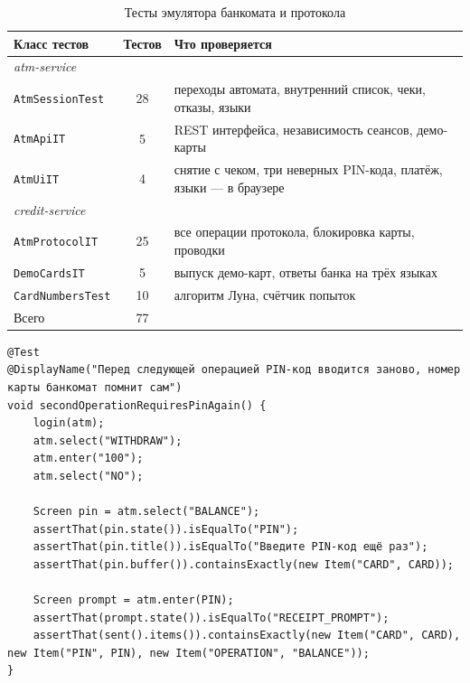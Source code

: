 \documentclass[14pt,a4paper]{extarticle}
\begin{document}
\begin{table}[H]
\caption{Тесты эмулятора банкомата и протокола}
\label{tab:tests}
\centering
\small
\begin{tabularx}{\textwidth}{lcX}
\toprule
Класс тестов & Тестов & Что проверяется \\
\midrule
\multicolumn{3}{l}{\textit{atm-service}} \\
\texttt{AtmSessionTest} & 28 & переходы автомата, внутренний список, чеки, отказы, языки \\
\texttt{AtmApiIT} & 5 & REST интерфейса, независимость сеансов, демо-карты \\
\texttt{AtmUiIT} & 4 & снятие с чеком, три неверных PIN-кода, платёж, языки --- в браузере \\
\midrule
\multicolumn{3}{l}{\textit{credit-service}} \\
\texttt{AtmProtocolIT} & 25 & все операции протокола, блокировка карты, проводки \\
\texttt{DemoCardsIT} & 5 & выпуск демо-карт, ответы банка на трёх языках \\
\texttt{CardNumbersTest} & 10 & алгоритм Луна, счётчик попыток \\
\midrule
Всего & 77 & \\
\bottomrule
\end{tabularx}
\end{table}

\begin{lstlisting}[style=java, caption={Тест правила повторного ввода PIN-кода (\texttt{AtmSessionTest})}, label={lst:test}]
@Test
@DisplayName("Перед следующей операцией PIN-код вводится заново, номер карты банкомат помнит сам")
void secondOperationRequiresPinAgain() {
    login(atm);
    atm.select("WITHDRAW");
    atm.enter("100");
    atm.select("NO");

    Screen pin = atm.select("BALANCE");
    assertThat(pin.state()).isEqualTo("PIN");
    assertThat(pin.title()).isEqualTo("Введите PIN-код ещё раз");
    assertThat(pin.buffer()).containsExactly(new Item("CARD", CARD));

    Screen prompt = atm.enter(PIN);
    assertThat(prompt.state()).isEqualTo("RECEIPT_PROMPT");
    assertThat(sent().items()).containsExactly(new Item("CARD", CARD), new Item("PIN", PIN), new Item("OPERATION", "BALANCE"));
}
\end{lstlisting}

\end{document}
